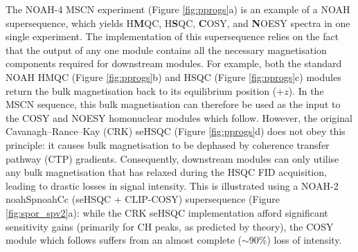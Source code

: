 \documentclass[11pt]{article}
\newcommand*{\noahtwo}[2]{\csname noah#1\endcsname\csname noah#2\endcsname}
\newcommand*{\carbon}{\ce{^{13}C}}
\newcommand*{\nitrogen}{\ce{^{15}N}}
\newcommand*{\figref}[1]{Figure \ref{fig:#1}}
\begin{document}
The NOAH-4 MSCN experiment (\figref{pprogs}a) is an example of a NOAH supersequence, which yields \nitrogen{} H\textbf{M}QC, \carbon{} H\textbf{S}QC, \textbf{C}OSY, and \textbf{N}OESY spectra in one single experiment.
The implementation of this supersequence relies on the fact that the output of any one module contains all the necessary magnetisation components required for downstream modules.
For example, both the standard NOAH HMQC (\figref{pprogs}b) and HSQC (\figref{pprogs}c) modules return the bulk magnetisation back to its equilibrium position ($+z$).
In the MSCN sequence, this bulk magnetisation can therefore be used as the input to the COSY and NOESY homonuclear modules which follow.
However, the original Cavanagh--Rance--Kay (CRK) seHSQC (\figref{pprogs}d) does not obey this principle: it causes bulk magnetisation to be dephased by coherence transfer pathway (CTP) gradients.
Consequently, downstream modules can only utilise any bulk magnetisation that has relaxed during the HSQC FID acquisition, leading to drastic losses in signal intensity.
This is illustrated using a NOAH-2 \noahtwo{Sp}{Cc} (seHSQC + CLIP-COSY\autocite{Koos2016ACIE}) supersequence (\figref{spor_spv2}a): while the CRK seHSQC implementation afford significant sensitivity gains (primarily for CH peaks, as predicted by theory\autocite{sehsqc_sens}), the COSY module which follows suffers from an almost complete ($\sim 90\%$) loss of intensity.
\end{document}
